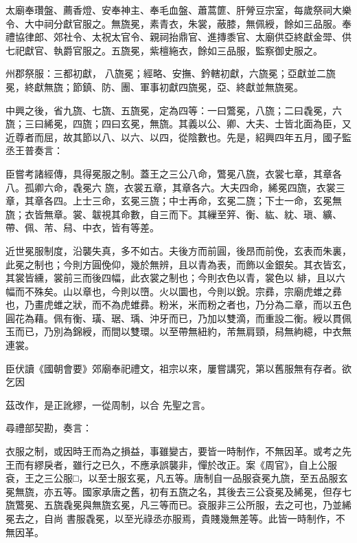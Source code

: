 \begin{pinyinscope}
 太廟奉瓚盤、薦香燈、安奉神主、奉毛血盤、蕭蒿篚、肝膋豆宗室，每歲祭祠大樂令、大中祠分獻官服之。無旒冕，素青衣，朱裳，蔽膝，無佩綬，餘如三品服。奉禮協律郎、郊社令、太祝太官令、親祠抬鼎官、進摶黍官、太廟供亞終獻金斝、供七祀獻官、執爵官服之。五旒冕，紫檀絁衣，餘如三品服，監察御史服之。



 州郡祭服：三都初獻，
 八旒冕；經略、安撫、鈐轄初獻，六旒冕；亞獻並二旒冕，終獻無旒；節鎮、防、團、軍事初獻四旒冕，亞、終獻並無旒冕。



 中興之後，省九旒、七旒、五旒冕，定為四等：一曰鷩冕，八旒；二曰毳冕，六旒；三曰絺冕，四旒；四曰玄冕，無旒。其義以公、卿、大夫、士皆北面為臣，又近尊者而屈，故其節以八、以六、以四，從陰數也。先是，紹興四年五月，國子監丞王普奏言：



 臣嘗考諸經傳，具得冕服之制。蓋王之三公八命，鷩冕八旒，衣裳七章，其章各八。孤卿六命，毳冕六
 旒，衣裳五章，其章各六。大夫四命，絺冕四旒，衣裳三章，其章各四。上士三命，玄冕三旒；中士再命，玄冕二旒；下士一命，玄冕無旒；衣皆無章。裳、韍視其命數，自三而下。其繅至笄、衡、紘、紞、瑱、纊、帶、佩、芾、舄、中衣，皆有等差。



 近世冕服制度，沿襲失真，多不如古。夫後方而前圓，後昂而前俛，玄表而朱裏，此冕之制也；今則方圓俛仰，幾於無辨，且以青為表，而飾以金銀矣。其衣皆玄，其裳皆纁，裳前三而後四幅，此衣裳之制也；今則衣色以青，裳色以
 緋，且以六幅而不殊矣。山以章也，今則以嶞。火以圜也，今則以銳。宗彞，宗廟虎蜼之彞也，乃畫虎蜼之狀，而不為虎蜼彞。粉米，米而粉之者也，乃分為二章，而以五色圓花為藉。佩有衡、璜、琚、瑀、沖牙而已，乃加以雙滴，而重設二衡。綬以貫佩玉而已，乃別為錦綬，而間以雙環。以至帶無紐約，芾無肩頸，舄無絇繶，中衣無連裳。



 臣伏讀《國朝會要》郊廟奉祀禮文，祖宗以來，屢嘗講究，第以舊服無有存者。欲乞因



 茲改作，是正訛繆，一從周制，以合
 先聖之言。



 尋禮部契勘，奏言：



 衣服之制，或因時王而為之損益，事雖變古，要皆一時制作，不無因革。或考之先王而有繆戾者，雖行之已久，不應承誤襲非，憚於改正。案《周官》，自上公服袞，王之三公服□，以至士服玄冕，凡五等。唐制自一品服袞冕九旒，至五品服玄冕無旒，亦五等。國家承唐之舊，初有五旒之名，其後去三公袞冕及絺冕，但存七旒鷩冕、五旒毳冕與無旒玄冕，凡三等而已。袞服非三公所服，去之可也，乃並絺冕去之，自尚
 書服毳冕，以至光祿丞亦服焉，貴賤幾無差等。此皆一時制作，不無因革。




\end{pinyinscope}
